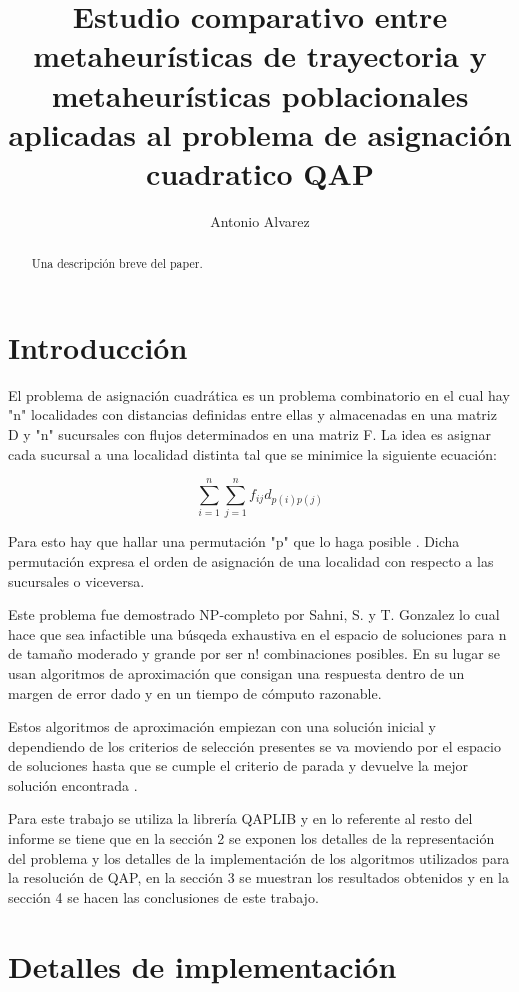 \documentclass{ci5652}
\title{Estudio comparativo entre metaheurísticas de trayectoria y metaheurísticas poblacionales aplicadas al problema de asignación cuadratico QAP}
\author{Antonio Alvarez}
\begin{document}
\thispagestyle{empty}
\maketitle

\begin{abstract}
Una descripción breve del paper.
\end{abstract}

\section{Introducción}
El problema de asignación cuadrática es un problema combinatorio en el cual hay "n" localidades con distancias definidas entre ellas y almacenadas en una matriz D y "n" sucursales con flujos determinados en una matriz F. La idea es asignar cada sucursal a una localidad distinta tal que se minimice la siguiente ecuación: 

\begin {equation*}
\sum_{i=1}^{n} \sum_{j=1}^{n} f_{ij} d_{p(i)p(j)}
\end {equation*}

Para esto hay que hallar una permutación "p"  que lo haga posible \cite{1}. Dicha permutación expresa el orden de asignación de una localidad con respecto a las sucursales o viceversa.

Este problema fue demostrado NP-completo por Sahni, S. y T. Gonzalez \cite{2} lo cual hace que sea infactible una búsqeda exhaustiva en el espacio de soluciones para n de tamaño moderado y grande por ser n! combinaciones posibles. En su lugar se usan algoritmos de aproximación que consigan una respuesta dentro de un margen de error dado y en un tiempo de cómputo razonable.

Estos algoritmos de aproximación empiezan con una solución inicial y dependiendo de los criterios de selección presentes se va moviendo por el espacio de soluciones hasta que se cumple el criterio de parada y devuelve la mejor solución encontrada \cite{4}.

Para este trabajo se utiliza la librería QAPLIB \cite{5} y en lo referente al resto del informe se tiene que en la sección 2 se exponen los detalles de la representación del problema y los detalles de la implementación de los algoritmos utilizados para la resolución de QAP, en la sección 3 se muestran los resultados obtenidos y en la sección 4 se hacen las conclusiones de este trabajo. 

\section{Detalles de implementación}
\end{document}
